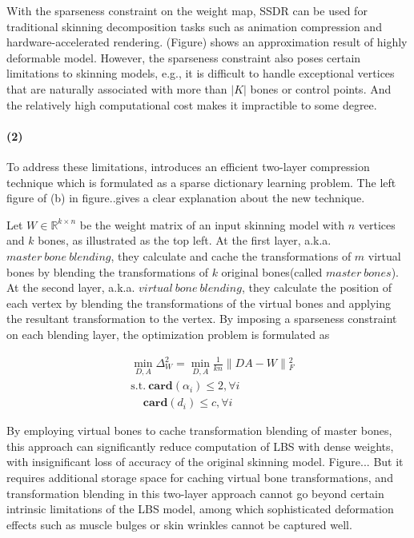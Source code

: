 With the sparseness constraint on the weight map, SSDR can be used for traditional skinning decomposition tasks such as animation compression and hardware-accelerated rendering.
(Figure) shows an approximation result of highly deformable model.
However, the sparseness constraint also poses certain limitations to skinning models,
e.g., it is difficult to handle exceptional vertices that are naturally associated with more than $|K|$ bones or control points.
And the relatively high computational cost makes it impractible to some degree.

\paragraph{(2)}
To address these limitations, \cite{le2013two} introduces an efficient two-layer compression technique which is formulated as a sparse dictionary learning problem. The left figure of (b) in figure..gives a clear explanation about the new technique.

Let $W\in\mathbb{R}^{k\times n}$ be the weight matrix of an input skinning model with $n$ vertices and $k$ bones, as illustrated as the top left.
At the first layer, a.k.a. $master~bone~blending$, they calculate and cache the transformations of $m$ virtual bones by blending the transformations of $k$ original bones(called $master~bones$).
At the second layer, a.k.a. $virtual~bone~blending$, they calculate the position of each vertex by blending the transformations of the virtual bones and applying the resultant transformation to the vertex.
By imposing a sparseness constraint on each blending layer, the optimization problem is formulated as

\small{
\begin{equation}
 \label{eq:TwoLayer}
 \begin{split}
 & \min_{D,A}\Delta_{W}^2=\min_{D,A}\frac{1}{kn}\|DA-W\|{_{F}^2} \\
 & \mathrm{s.t.}~\textbf{card}(\alpha_{i})\leq2,\forall i\\
 & ~~~~~\textbf{card}(d_{i})\leq c,\forall i
 \end{split}
\end{equation}
}

By employing virtual bones to cache transformation blending of master bones,
this approach can significantly reduce computation of LBS with dense weights, with insignificant loss of accuracy of the original skinning model. Figure...
But it requires additional storage space for caching virtual bone transformations,
and transformation blending in this two-layer approach cannot go beyond certain intrinsic limitations of the LBS model,
among which sophisticated deformation effects such as muscle bulges or skin wrinkles cannot be captured well.



